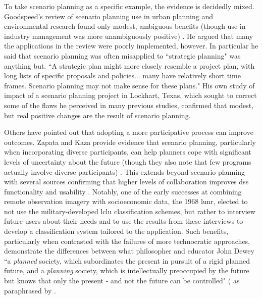 To take scenario planning as a specific example, the evidence is decidedly mixed. Goodspeed's review of scenario planning use in urban planning and environmental research found only modest, ambiguous benefits (though use in industry management was more unambiguously positive) \cite{goodspeedScenarioPlanningCities2020}. He argued that many the applications in the review were poorly implemented, however. In particular he said that scenario planning was often misapplied to ``strategic planning" was anything but. ``A strategic plan might more closely resemble a project plan, with long lists of specific proposals and policies... many have relatively short time frames. Scenario planning may not make sense for these plans." His own study of impact of a scenario planning project in Lockhart, Texas, which sought to correct some of the flaws he perceived in many previous studies, confirmed that modest, but real positive changes are the result of scenario planning.

Others have pointed out that adopting a more participative process can improve outcomes. Zapata and Kaza provide evidence that scenario planning, particularly when incorporating diverse participants, can help planners cope with significant levels of uncertainty about the future (though they also note that few programs actually involve diverse participants) \cite{zapataRadicalUncertaintyScenario2015}. This extends beyond scenario planning with several sources confirming that higher levels of collaboration improves \ac{dss} functionality and usability \cite{goodspeedDeathLifeCollaborative2016, vonkSociotechnicalPSSDevelopment2010, brommelstroetPlanningSupportSystems2010, ulibarriCollaborativeModelDevelopment2018}. Notably, one of the early successes at combining remote observation imagery with socioeconomic data, the 1968 \ac{lunr}, elected to not use the military-developed \ac{lclu} classification schemes, but rather to interview future users about their needs and to use the results from these interviews to develop a classification system tailored to the application. Such benefits, particularly when contrasted with the failures of more technocratic approaches, demonstrate the differences between what philosopher and educator John Dewey ``a \textit{planned} society, which subordinates the present in pursuit of a rigid planned future, and a \textit{planning} society, which is intellectually preoccupied by the future but knows that only the present - and not the future can be controlled" (\cite{deweyHumanNatureConduct2007} as paraphrased by \cite{goodspeedScenarioPlanningCities2020}.


